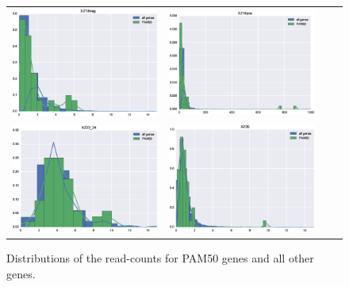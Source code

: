 \documentclass[11pt,a4paper]{article}
\begin{document}
\begin{figure}[htb]
\centering
  \begin{tabular}{@{}cccc@{}}
    \includegraphics[width=.5\textwidth]{18neg.eps} &
    \includegraphics[width=.5\textwidth]{18pos.eps} \\
    \includegraphics[width=.5\textwidth]{23_24.eps} &
    \includegraphics[width=.5\textwidth]{30.eps}   \\
  \end{tabular}
  \caption{Distributions of the read-counts for PAM50 genes and all other genes.}
  \label{fig:pam50_distro}
\end{figure}
\end{document}
